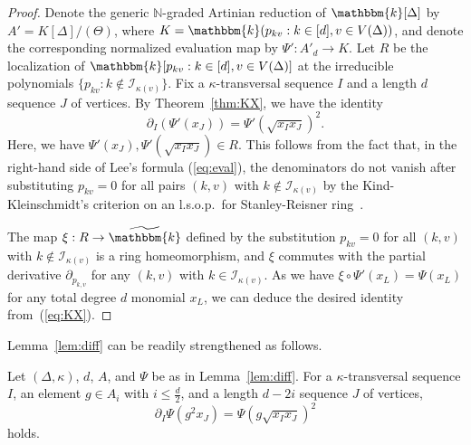 \begin{proof}
Denote the generic $\mathbb{N}$-graded Artinian reduction of $\mathbbm{k}[\Delta]$ by $A'=K[\Delta]/(\Theta)$, where $K=\mathbbm{k}(p_{kv}:k \in [d], v\in V(\Delta))$, and denote the corresponding normalized evaluation map by $\Psi':A'_d \rightarrow K$.
Let $R$ be the localization of $\mathbbm{k}[p_{kv}:k \in [d], v\in V(\Delta)]$ at the irreducible polynomials $\{p_{kv}:k \not\in \mathcal{I}_{\kappa(v)}\}$.
Fix a $\kappa$-transversal sequence $I$ and a length $d$ sequence $J$ of vertices.
By Theorem~\ref{thm:KX}, we have the identity
\begin{equation}\label{eq:KX}
    \partial_I(\Psi'(x_J)) = \Psi'(\sqrt{x_Ix_J})^2.
\end{equation}
Here, we have $\Psi'(x_J), \Psi'(\sqrt{x_Ix_J}) \in R$.
This follows from the fact that, in the right-hand side of Lee's formula (\ref{eq:eval}), the denominators do not vanish after substituting $p_{kv}=0$ for all pairs $(k,v)$ with $k \not\in \mathcal{I}_{\kappa(v)}$ by the Kind-Kleinschmidt's criterion on an l.s.o.p.~for Stanley-Reisner ring~\cite[Lemma III.2.4]{Sta-book}.

The map $\xi:R \rightarrow \widetilde{\mathbbm{k}}$ defined by the substitution $p_{kv}=0$ for all $(k,v)$ with $k \not\in \mathcal{I}_{\kappa(v)}$ is a ring homeomorphism, and $\xi$ commutes with the partial derivative $\partial_{p_{k,v}}$ for any $(k,v)$ with $k\in \mathcal{I}_{\kappa(v)}$.
As we have $\xi \circ \Psi'(x_L)=\Psi(x_L)$ for any total degree $d$ monomial $x_L$, we can deduce the desired identity from~(\ref{eq:KX}).
\end{proof}
Lemma~\ref{lem:diff} can be readily strengthened as follows.
\begin{coro} \label{cor:diff general}
Let $(\Delta,\kappa)$, $d$, $A$, and $\Psi$ be as in Lemma~\ref{lem:diff}. 
For a $\kappa$-transversal sequence $I$, an element $g \in A_i$ with $i \leq \frac{d}{2}$, and a length $d-2i$ sequence $J$ of vertices,
\[
\partial_I \Psi(g^2x_J) =\Psi(g\sqrt{x_Ix_J})^2
\]
holds.
\end{coro}
